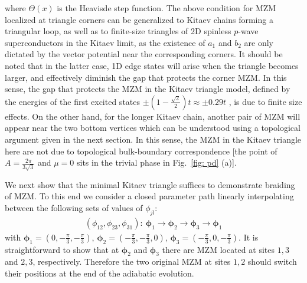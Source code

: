 \documentclass[aps,prb,twocolumn,showpacs,amsmath,amssymb,superscriptaddress]{revtex4-2}
\begin{document}
where $\Theta(x)$ is the Heavisde step function. The above condition for MZM localized at triangle corners can be generalized to Kitaev chains forming a triangular loop, as well as to finite-size triangles of 2D spinless $p$-wave superconductors in the Kitaev limit, as the existence of $a_1$ and $b_2$ are only dictated by the vector potential near the corresponding corners. It should be noted that in the latter case, 1D edge states will arise when the triangle becomes larger, and effectively diminish the gap that protects the corner MZM. In this sense, the gap that protects the MZM in the Kitaev triangle model, defined by the energies of the first excited states $\pm (1-\frac{\sqrt{2}}{2})t\approx \pm 0.29 t$ \cite{supp}, is due to finite size effects. On the other hand, for the longer Kitaev chain, another pair of MZM will appear near the two bottom vertices which can be understood using a topological argument given in the next section. In this sense, the MZM in the Kitaev triangle here are not due to topological bulk-boundary correspondence [the point of $A = \frac{2\pi}{3\sqrt{3}}$ and $\mu=0$ sits in the trivial phase in Fig.~\ref{fig: pd} (a)].

We next show that the minimal Kitaev triangle suffices to demonstrate braiding of MZM. To this end we consider a closed parameter path linearly interpolating between the following sets of values of $\phi_{jl}$:
\begin{eqnarray}
  (\phi_{12},\phi_{23},\phi_{31}):~\bm \phi_1\rightarrow \bm \phi_2 \rightarrow \bm \phi_3 \rightarrow \bm \phi_1
\end{eqnarray}
with $\bm \phi_1 = \left(0,-\frac{\pi}{3},-\frac{\pi}{3}\right )$, $\bm \phi_2 = \left(-\frac{\pi}{3},-\frac{\pi}{3}, 0\right)$, $\bm \phi_3 = \left(-\frac{\pi}{3}, 0, -\frac{\pi}{3}\right )$. It is straightforward to show that at $\bm \phi_{2}$ and $\bm \phi_3$ there are MZM located at sites $1,3$ and $2,3$, respectively. Therefore the two original MZM at sites $1,2$ should switch their positions at the end of the adiabatic evolution.
\end{document}
